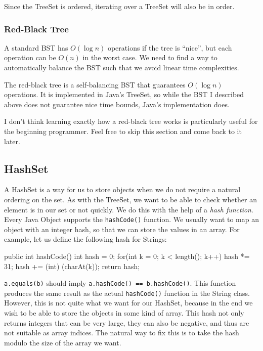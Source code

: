 \documentclass[11pt]{book}
\begin{document}
Since the TreeSet is ordered, iterating over a TreeSet will also be in order.

\subsubsection{Red-Black Tree}

A standard BST has $O(\log{n})$ operations if the tree is ``nice'', but each operation can be $O(n)$ in the worst case. We need to find a way to automatically balance the BST such that we avoid linear time complexities.

The red-black tree is a self-balancing BST that guarantees $O(\log{n})$ operations. It is implemented in Java's TreeSet, so while the BST I described above does not guarantee nice time bounds, Java's implementation does.

I don't think learning exactly how a red-black tree works is particularly useful for the beginning programmer. Feel free to skip this section and come back to it later.

\subsection{HashSet}

A HashSet is a way for us to store objects when we do not require a natural ordering on the set. As with the TreeSet, we want to be able to check whether an element is in our set or not quickly. We do this with the help of a \textit{hash function}. Every Java Object supports the \texttt{hashCode()} function. We usually want to map an object with an integer hash, so that we can store the values in an array. For example, let us define the following hash for Strings:

\begin{mylstlisting}
public int hashCode() {
	int hash = 0;
    for(int k = 0; k < length(); k++) {
		hash *= 31;
        hash += (int) (charAt(k));
    }
    return hash;
}
\end{mylstlisting}

\texttt{a.equals(b)} should imply \texttt{a.hashCode() == b.hashCode()}. This function produces the same result as the actual \texttt{hashCode()} function in the String class. However, this is not quite what we want for our HashSet, because in the end we wish to be able to store the objects in some kind of array. This hash not only returns integers that can be very large, they can also be negative, and thus are not suitable as array indices. The natural way to fix this is to take the hash modulo the size of the array we want.
\end{document}
